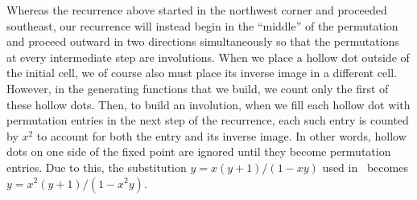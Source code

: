 \documentclass[10pt]{article}
\theoremstyle{plain}
\begin{document}
Whereas the recurrence above started in the northwest corner and proceeded southeast, our recurrence will instead begin in the ``middle'' of the permutation and proceed outward in two directions simultaneously so that the permutations at every intermediate step are involutions. When we place a hollow dot outside of the initial cell, we of course also must place its inverse image in a different cell. However, in the generating functions that we build, we count only the first of these hollow dots. Then, to build an involution, when we fill each hollow dot with permutation entries in the next step of the recurrence, each such entry is counted by $x^2$ to account for both the entry and its inverse image. In other words, hollow dots on one side of the fixed point are ignored until they become permutation entries. Due to this, the substitution $y = x(y+1)/(1-xy)$ used in~\cite{albert:generating-and-:} becomes $y = x^2(y+1)/(1-x^2y)$.
\end{document}

